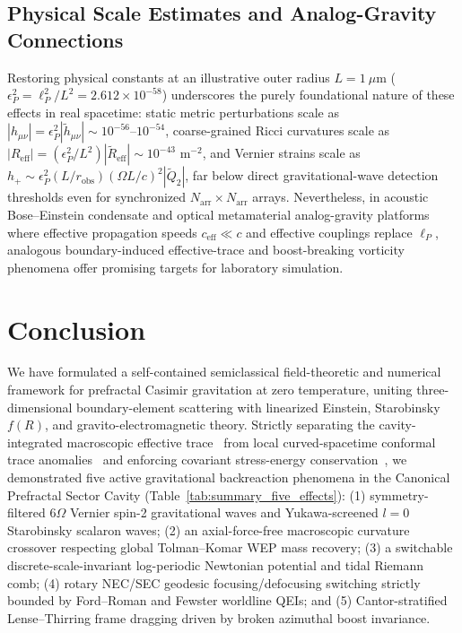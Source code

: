 \documentclass[aps,prd,twocolumn,10pt,showkeys,nofootinbib,floatfix,longbibliography]{revtex4-2}
\begin{document}
\subsection{Physical Scale Estimates and Analog-Gravity Connections}
Restoring physical constants at an illustrative outer radius $L = 1\ \mu\text{m}$ ($\epsilon_P^2 = \ell_P^2/L^2 = 2.612 \times 10^{-58}$) underscores the purely foundational nature of these effects in real spacetime: static metric perturbations scale as $|h_{\mu\nu}| = \epsilon_P^2 |\tilde{h}_{\mu\nu}| \sim 10^{-56}\text{--}10^{-54}$, coarse-grained Ricci curvatures scale as $|R_{\mathrm{eff}}| = (\epsilon_P^2/L^2)|\tilde{R}_{\mathrm{eff}}| \sim 10^{-43}\text{ m}^{-2}$, and Vernier strains scale as $h_+ \sim \epsilon_P^2 (L/r_{\mathrm{obs}})(\Omega L/c)^2 |\tilde{Q}_2|$, far below direct gravitational-wave detection thresholds even for synchronized $N_{\mathrm{arr}} \times N_{\mathrm{arr}}$ arrays. Nevertheless, in acoustic Bose--Einstein condensate and optical metamaterial analog-gravity platforms where effective propagation speeds $c_{\mathrm{eff}} \ll c$ and effective couplings replace $\ell_P$, analogous boundary-induced effective-trace and boost-breaking vorticity phenomena offer promising targets for laboratory simulation.

\section{Conclusion}
\label{sec:conclusion}

We have formulated a self-contained semiclassical field-theoretic and numerical framework for prefractal Casimir gravitation at zero temperature, uniting three-dimensional boundary-element scattering with linearized Einstein, Starobinsky $f(R)$, and gravito-electromagnetic theory. Strictly separating the cavity-integrated macroscopic effective trace~\cite{gordon2026prd} from local curved-spacetime conformal trace anomalies~\cite{duff1994,setare2000} and enforcing covariant stress-energy conservation~\cite{fulling2007,sorge2021buoyancy}, we demonstrated five active gravitational backreaction phenomena in the Canonical Prefractal Sector Cavity (Table~\ref{tab:summary_five_effects}): (1) symmetry-filtered $6\Omega$ Vernier spin-2 gravitational waves and Yukawa-screened $l=0$ Starobinsky scalaron waves; (2) an axial-force-free macroscopic curvature crossover respecting global Tolman--Komar WEP mass recovery; (3) a switchable discrete-scale-invariant log-periodic Newtonian potential and tidal Riemann comb; (4) rotary NEC/SEC geodesic focusing/defocusing switching strictly bounded by Ford--Roman and Fewster worldline QEIs; and (5) Cantor-stratified Lense--Thirring frame dragging driven by broken azimuthal boost invariance.
\end{document}
